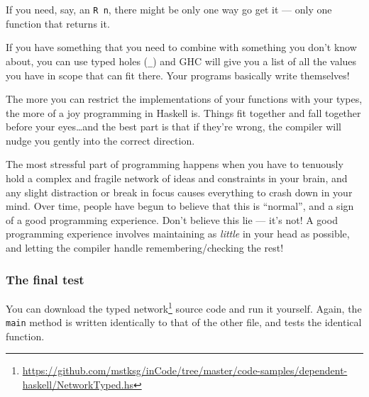 \documentclass[]{article}
\newenvironment{Shaded}{}{}
\newcommand{\KeywordTok}[1]{\textcolor[rgb]{0.00,0.44,0.13}{\textbf{{#1}}}}
\newcommand{\CommentTok}[1]{\textcolor[rgb]{0.38,0.63,0.69}{\textit{{#1}}}}
\newcommand{\NormalTok}[1]{{#1}}
\renewcommand{\href}[2]{#2\footnote{\url{#1}}}
\begin{document}
If you need, say, an \texttt{R\ n}, there might be only one way go get
it --- only one function that returns it.

If you have something that you need to combine with something you don't
know about, you can use typed holes (\texttt{\_}) and GHC will give you
a list of all the values you have in scope that can fit there. Your
programs basically write themselves!

The more you can restrict the implementations of your functions with
your types, the more of a joy programming in Haskell is. Things fit
together and fall together before your eyes\ldots{}and the best part is
that if they're wrong, the compiler will nudge you gently into the
correct direction.

The most stressful part of programming happens when you have to
tenuously hold a complex and fragile network of ideas and constraints in
your brain, and any slight distraction or break in focus causes
everything to crash down in your mind. Over time, people have begun to
believe that this is ``normal'', and a sign of a good programming
experience. Don't believe this lie --- it's not! A good programming
experience involves maintaining as \emph{little} in your head as
possible, and letting the compiler handle remembering/checking the rest!

\subsubsection{The final test}\label{the-final-test}

You can download the
\href{https://github.com/mstksg/inCode/tree/master/code-samples/dependent-haskell/NetworkTyped.hs}{typed
network} source code and run it yourself. Again, the \texttt{main}
method is written identically to that of the other file, and tests the
identical function.

\begin{Shaded}
\end{Shaded}
\end{document}
